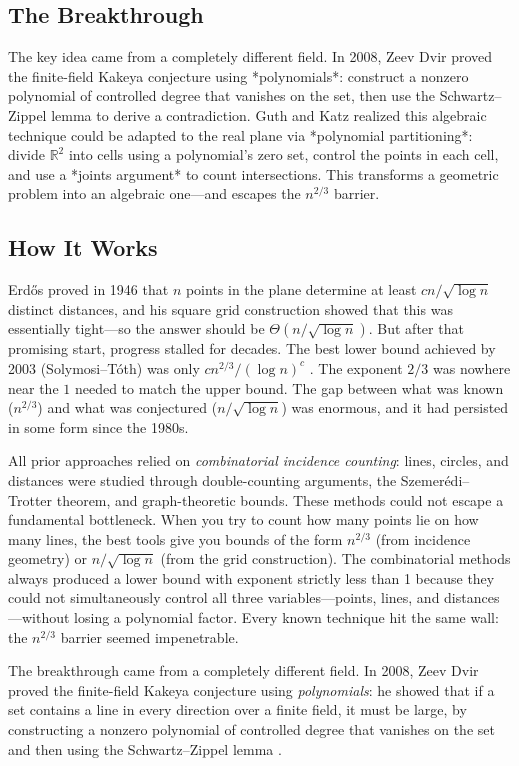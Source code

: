 \subsection{The Breakthrough}
The key idea came from a completely different field. In 2008, Zeev Dvir proved the finite-field Kakeya conjecture using *polynomials*: construct a nonzero polynomial of controlled degree that vanishes on the set, then use the Schwartz--Zippel lemma to derive a contradiction. Guth and Katz realized this algebraic technique could be adapted to the real plane via *polynomial partitioning*: divide $\mathbb{R}^2$ into cells using a polynomial's zero set, control the points in each cell, and use a *joints argument* to count intersections. This transforms a geometric problem into an algebraic one---and escapes the $n^{2/3}$ barrier.

\subsection{How It Works}

Erd\H{o}s proved in 1946 that $n$ points in the plane determine at least $cn/\sqrt{\log n}$ distinct distances, and his square grid construction showed that this was essentially tight---so the answer should be $\Theta(n/\sqrt{\log n})$. But after that promising start, progress stalled for decades. The best lower bound achieved by 2003 (Solymosi--T\'oth) was only $cn^{2/3}/(\log n)^c$ \cite{solymosi2003}. The exponent $2/3$ was nowhere near the $1$ needed to match the upper bound. The gap between what was known ($n^{2/3}$) and what was conjectured ($n/\sqrt{\log n}$) was enormous, and it had persisted in some form since the 1980s.

All prior approaches relied on \emph{combinatorial incidence counting}: lines, circles, and distances were studied through double-counting arguments, the Szemer\'edi--Trotter theorem, and graph-theoretic bounds. These methods could not escape a fundamental bottleneck. When you try to count how many points lie on how many lines, the best tools give you bounds of the form $n^{2/3}$ (from incidence geometry) or $n/\sqrt{\log n}$ (from the grid construction). The combinatorial methods always produced a lower bound with exponent strictly less than 1 because they could not simultaneously control all three variables---points, lines, and distances---without losing a polynomial factor. Every known technique hit the same wall: the $n^{2/3}$ barrier seemed impenetrable.

The breakthrough came from a completely different field. In 2008, Zeev Dvir proved the finite-field Kakeya conjecture using \emph{polynomials}: he showed that if a set contains a line in every direction over a finite field, it must be large, by constructing a nonzero polynomial of controlled degree that vanishes on the set and then using the Schwartz--Zippel lemma \cite{dvir2009}.

